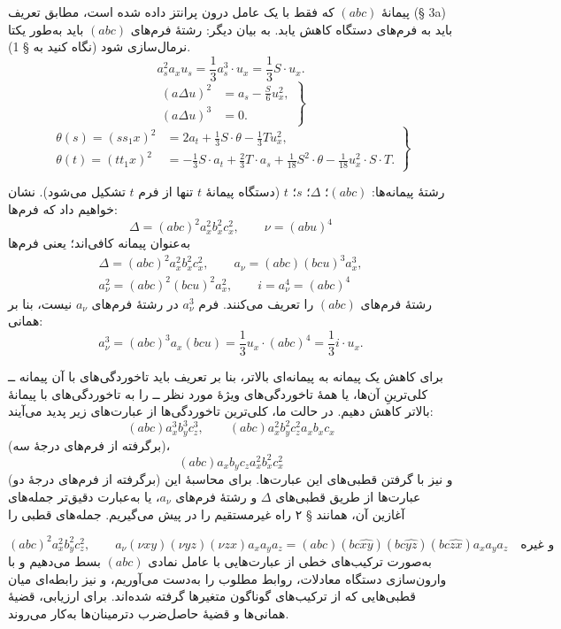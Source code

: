 \documentclass[11pt]{article}
\begin{document}
پیمانهٔ $(abc)$ که فقط با یک عامل درون پرانتز داده شده است، مطابق تعریف (§ 3a) باید به فرم‌های دستگاه کاهش یابد. به بیان دیگر: رشتهٔ فرم‌های $(abc)$ باید به‌طور یکتا نرمال‌سازی شود (نگاه کنید به § 1).
\[
a_s^2a_xu_s=\frac13a_s^3\cdot u_x=\frac13S\cdot u_x. \tag{2.}
\]
\[
\left.
\begin{aligned}
(a\Delta u)^2&=a_s-\frac{S}{6}u_x^2,\\
(a\Delta u)^3&=0.
\end{aligned}
\right\} \tag{3.}
\]
\[
\left.
\begin{aligned}
\theta(s)=(ss_1x)^2&=2a_t+\frac13S\cdot\theta-\frac13Tu_x^2,\\
\theta(t)=(tt_1x)^2&=-\frac13S\cdot a_t+\frac23T\cdot a_s+\frac1{18}S^2\cdot\theta-\frac1{18}u_x^2\cdot S\cdot T.
\end{aligned}
\right\} \tag{4.}
\]

رشتهٔ پیمانه‌ها: $(abc)$؛ $\Delta$؛ $s$؛ $t$ (دستگاه پیمانهٔ $t$ تنها از فرم $t$ تشکیل می‌شود).
نشان خواهیم داد که فرم‌ها:
\[
\Delta=(abc)^2a_x^2b_x^2c_x^2,\qquad \nu=(abu)^4
\]
به‌عنوان پیمانه کافی‌اند؛ یعنی فرم‌ها
\[
\begin{gathered}
\Delta=(abc)^2a_x^2b_x^2c_x^2,
\qquad a_\nu=(abc)(bcu)^3a_x^3,\\
a_\nu^2=(abc)^2(bcu)^2a_x^2,
\qquad i=a_\nu^4=(abc)^4
\end{gathered}
\]
رشتهٔ فرم‌های $(abc)$ را تعریف می‌کنند. فرم $a_\nu^3$ در رشتهٔ فرم‌های $a_\nu$ نیست، بنا بر همانی:
\[
a_\nu^3=(abc)^3a_x(bcu)=\frac13u_x\cdot(abc)^4=\frac13i\cdot u_x.
\]

برای کاهش یک پیمانه به پیمانه‌ای بالاتر، بنا بر تعریف باید تاخوردگی‌های با آن پیمانه ــ کلی‌ترینِ آن‌ها، یا همهٔ تاخوردگی‌های ویژهٔ مورد نظر ــ را به تاخوردگی‌های با پیمانهٔ بالاتر کاهش دهیم.
در حالت ما، کلی‌ترین تاخوردگی‌ها از عبارت‌های زیر پدید می‌آیند:
\[
(abc)a_x^3b_y^3c_z^3,
\qquad
(abc)a_x^2b_y^2c_z^2a_xb_xc_x
\]
(برگرفته از فرم‌های درجهٔ سه)،
\[
(abc)a_xb_yc_za_x^2b_x^2c_x^2
\]
(برگرفته از فرم‌های درجهٔ دو) و نیز با گرفتن قطبی‌های این عبارت‌ها.
برای محاسبهٔ این عبارت‌ها از طریق قطبی‌های $\Delta$ و رشتهٔ فرم‌های $a_\nu$، یا به‌عبارت دقیق‌تر جمله‌های آغازین آن، همانند § ۲ راه غیرمستقیم را در پیش می‌گیریم. جمله‌های قطبی را

\[
(abc)^2a_x^2b_y^2c_z^2,
\qquad
 a_\nu(\nu xy)(\nu yz)(\nu zx)a_xa_ya_z=(abc)(bc\widehat{xy})(bc\widehat{yz})(bc\widehat{zx})a_xa_ya_z\quad\text{و غیره}
\]
به‌صورت ترکیب‌های خطی از عبارت‌هایی با عامل نمادی $(abc)$ بسط می‌دهیم و با وارون‌سازی دستگاه معادلات، روابط مطلوب را به‌دست می‌آوریم، و نیز رابطه‌ای میان قطبی‌هایی که از ترکیب‌های گوناگون متغیرها گرفته شده‌اند. برای ارزیابی، قضیهٔ همانی‌ها و قضیهٔ حاصل‌ضرب دترمینان‌ها به‌کار می‌روند.
\end{document}
